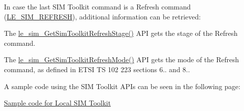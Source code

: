 In case the last S\+IM Toolkit command is a Refresh command (\hyperlink{le__sim__interface_8h_a7c53ab7f9f004387ef41e80df1121da2a4e4be9cfce6ef2e0832d707820cd106d}{L\+E\+\_\+\+S\+I\+M\+\_\+\+R\+E\+F\+R\+E\+SH}), additional information can be retrieved\+:
\begin{DoxyItemize}
\item The \hyperlink{le__sim__interface_8h_a81bd3909308a1456225e59f1f36e73e3}{le\+\_\+sim\+\_\+\+Get\+Sim\+Toolkit\+Refresh\+Stage()} A\+PI gets the stage of the Refresh command.
\item The \hyperlink{le__sim__interface_8h_a82331254a8f94c20c01a9962a488a29f}{le\+\_\+sim\+\_\+\+Get\+Sim\+Toolkit\+Refresh\+Mode()} A\+PI gets the mode of the Refresh command, as defined in E\+T\+SI TS 102 223 sections 6.. and 8..
\end{DoxyItemize}

A sample code using the S\+IM Toolkit A\+P\+Is can be seen in the following page\+:
\begin{DoxyItemize}
\item \hyperlink{c_simTestSimToolkit}{Sample code for Local S\+IM Toolkit}
\end{DoxyItemize}

